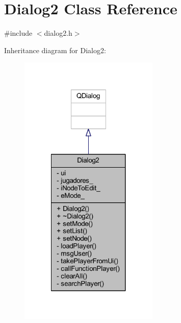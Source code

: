 \hypertarget{class_dialog2}{}\section{Dialog2 Class Reference}
\label{class_dialog2}


{\ttfamily \#include $<$dialog2.\+h$>$}



Inheritance diagram for Dialog2\+:
\nopagebreak
\begin{figure}[H]
\begin{center}
\leavevmode
\includegraphics[width=188pt]{de/d29/class_dialog2__inherit__graph}
\end{center}
\end{figure}


